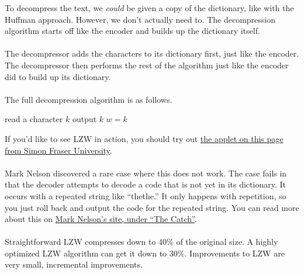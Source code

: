 \documentclass[]{article}
\theoremstyle{definition}
\begin{document}
				To decompress the text, we \emph{could} be given a copy of the dictionary, like with the Huffman approach. However, we don't actually need to. The decompression algorithm starts off like the encoder and builds up the dictionary itself.
				\\ \\
				The decompressor adds the characters to its dictionary first, just like the encoder. The decompressor then performs the rest of the algorithm just like the encoder did to build up its dictionary.
				\\ \\
				The full decompression algorithm is as follows. \\
				\begin{algorithm}[H]
					read a character $k$\;
					output $k$\;
					$w = k$\;
				\end{algorithm}
				
				If you'd like to see LZW in action, you should try out \href{http://www.cs.sfu.ca/CourseCentral/365/li/squeeze/LZW.html}{the applet on this page from Simon Fraser University}.
				\\ \\
				Mark Nelson discovered a rare case where this does not work. The case fails in that the decoder attempts to decode a code that is not yet in its dictionary. It occurs with a repeated string like ``thethe.'' It only happens with repetition, so you just roll back and output the code for the repeated string. You can read more about this on \href{http://marknelson.us/1989/10/01/lzw-data-compression/}{Mark Nelson's site, under ``The Catch''}.
				\\ \\
				Straightforward LZW compresses down to 40\% of the original size. A highly optimized LZW algorithm can get it down to 30\%. Improvements to LZW are very small, incremental improvements.
\end{document}
